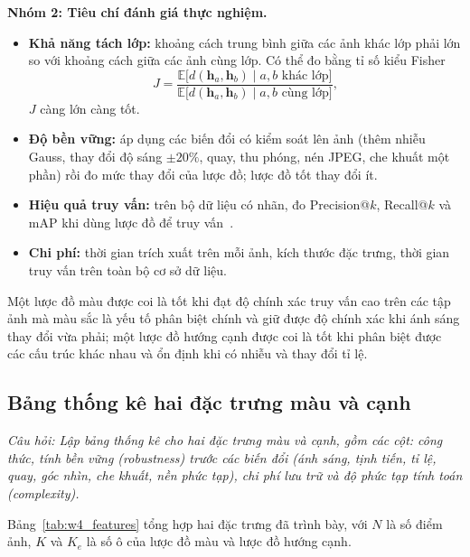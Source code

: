 \textbf{Nhóm 2: Tiêu chí đánh giá thực nghiệm.}
\begin{itemize}
    \item \textbf{Khả năng tách lớp:} khoảng cách trung bình giữa các ảnh khác lớp phải lớn so với khoảng cách giữa các ảnh cùng lớp. Có thể đo bằng tỉ số kiểu Fisher
    \begin{equation}
    J = \frac{\mathbb{E}\big[d(\mathbf{h}_a, \mathbf{h}_b) \mid a, b \text{ khác lớp}\big]}{\mathbb{E}\big[d(\mathbf{h}_a, \mathbf{h}_b) \mid a, b \text{ cùng lớp}\big]},
    \end{equation}
    $J$ càng lớn càng tốt.
    \item \textbf{Độ bền vững:} áp dụng các biến đổi có kiểm soát lên ảnh (thêm nhiễu Gauss, thay đổi độ sáng $\pm 20\%$, quay, thu phóng, nén JPEG, che khuất một phần) rồi đo mức thay đổi của lược đồ; lược đồ tốt thay đổi ít.
    \item \textbf{Hiệu quả truy vấn:} trên bộ dữ liệu có nhãn, đo Precision@$k$, Recall@$k$ và mAP khi dùng lược đồ để truy vấn~\citep{smeulders2000content}.
    \item \textbf{Chi phí:} thời gian trích xuất trên mỗi ảnh, kích thước đặc trưng, thời gian truy vấn trên toàn bộ cơ sở dữ liệu.
\end{itemize}

Một lược đồ màu được coi là tốt khi đạt độ chính xác truy vấn cao trên các tập ảnh mà màu sắc là yếu tố phân biệt chính và giữ được độ chính xác khi ánh sáng thay đổi vừa phải; một lược đồ hướng cạnh được coi là tốt khi phân biệt được các cấu trúc khác nhau và ổn định khi có nhiễu và thay đổi tỉ lệ.

\subsection{Bảng thống kê hai đặc trưng màu và cạnh}
\label{subsec:w4_table}

\textit{Câu hỏi: Lập bảng thống kê cho hai đặc trưng màu và cạnh, gồm các cột: công thức, tính bền vững (robustness) trước các biến đổi (ánh sáng, tịnh tiến, tỉ lệ, quay, góc nhìn, che khuất, nền phức tạp), chi phí lưu trữ và độ phức tạp tính toán (complexity).}

Bảng~\ref{tab:w4_features} tổng hợp hai đặc trưng đã trình bày, với $N$ là số điểm ảnh, $K$ và $K_e$ là số ô của lược đồ màu và lược đồ hướng cạnh.

